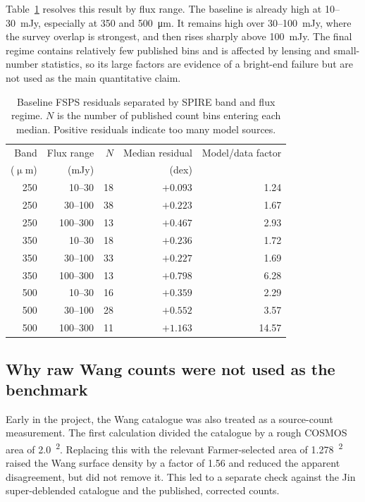 \documentclass[12pt,a4paper]{article}
\begin{document}
Table~\ref{tab:fsps_regimes} resolves this result by flux range. The baseline is already
high at 10--\SI{30}{mJy}, especially at 350 and \SI{500}{\um}. It remains high over
30--\SI{100}{mJy}, where the survey overlap is strongest, and then rises sharply above
\SI{100}{mJy}. The final regime contains relatively few published bins and is affected
by lensing and small-number statistics, so its large factors are evidence of a bright-end
failure but are not used as the main quantitative claim.

\begin{table}[H]
\centering
\caption{Baseline FSPS residuals separated by SPIRE band and flux regime. $N$ is the
number of published count bins entering each median. Positive residuals indicate too
many model sources.}
\label{tab:fsps_regimes}
\footnotesize
\begin{tabular}{@{}rrrrr@{}}
\toprule
Band & Flux range & $N$ & Median residual & Model/data factor \\
($\upmu$m) & (mJy) & & (dex) & \\
\midrule
250 & 10--30  & 18 & $+0.093$ & 1.24 \\
250 & 30--100 & 38 & $+0.223$ & 1.67 \\
250 & 100--300 & 13 & $+0.467$ & 2.93 \\
350 & 10--30  & 18 & $+0.236$ & 1.72 \\
350 & 30--100 & 33 & $+0.227$ & 1.69 \\
350 & 100--300 & 13 & $+0.798$ & 6.28 \\
500 & 10--30  & 16 & $+0.359$ & 2.29 \\
500 & 30--100 & 28 & $+0.552$ & 3.57 \\
500 & 100--300 & 11 & $+1.163$ & 14.57 \\
\bottomrule
\end{tabular}
\end{table}

\subsection{Why raw Wang counts were not used as the benchmark}
\label{sec:results:wang_counts}

Early in the project, the Wang catalogue was also treated as a source-count
measurement. The first calculation divided the catalogue by a rough COSMOS area of
\SI{2.0}{\deg\squared}. Replacing this with the relevant Farmer-selected area of
\SI{1.278}{\deg\squared} raised the Wang surface density by a factor of 1.56 and
reduced the apparent disagreement, but did not remove it. This led to a separate check
against the Jin super-deblended catalogue and the published, corrected counts.
\end{document}
